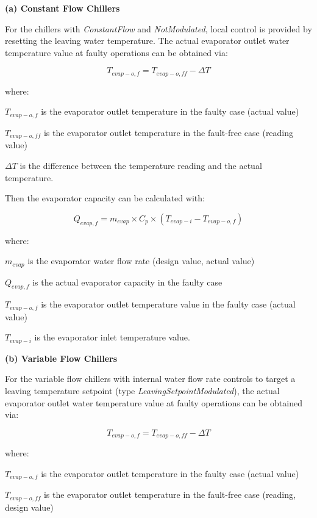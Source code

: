 \textbf{(a) Constant Flow Chillers}

For the chillers with \emph{ConstantFlow} and \emph{NotModulated}, local control is provided by resetting the leaving water temperature. The actual evaporator outlet water temperature value at faulty operations can be obtained via:

\begin{equation}
T_{evap-o,f} = T_{evap-o,ff} - \Delta T
\end{equation}

where:

\(T_{evap-o,f}\) is the evaporator outlet temperature in the faulty case (actual value)

\(T_{evap-o,ff}\) is the evaporator outlet temperature in the fault-free case (reading value)

\(\Delta T\) is the difference between the temperature reading and the actual temperature.

Then the evaporator capacity can be calculated with:

\begin{equation}
Q_{evap,f} = m_{evap} \times C_p \times (T_{evap-i} - T_{evap-o,f} )
\end{equation}

where:

\(m_{evap}\) is the evaporator water flow rate (design value, actual value)

\(Q_{evap,f}\) is the actual evaporator capacity in the faulty case

\(T_{evap-o,f}\) is the evaporator outlet temperature value in the faulty case (actual value)

\(T_{evap-i}\) is the evaporator inlet temperature value. \newline

\textbf{(b) Variable Flow Chillers}

For the variable flow chillers with internal water flow rate controls to target a leaving temperature setpoint (type \emph{LeavingSetpointModulated}), the actual evaporator outlet water temperature value at faulty operations can be obtained via:

\begin{equation}
T_{evap-o,f} = T_{evap-o,ff} - \Delta T
\end{equation}

where:

\(T_{evap-o,f}\) is the evaporator outlet temperature in the faulty case (actual value)

\(T_{evap-o,ff}\) is the evaporator outlet temperature in the fault-free case (reading, design value)

